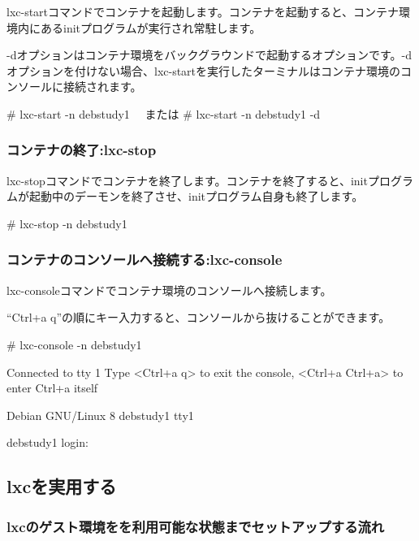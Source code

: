 \documentclass[mingoth,a4paper]{jsarticle}
\begin{document}
lxc-startコマンドでコンテナを起動します。コンテナを起動すると、コンテナ環境内にあるinitプログラムが実行され常駐します。

-dオプションはコンテナ環境をバックグラウンドで起動するオプションです。-dオプションを付けない場合、lxc-startを実行したターミナルはコンテナ環境のコンソールに接続されます。

\begin{commandline}
  # lxc-start -n debstudy1
  　または
  # lxc-start -n debstudy1 -d
\end{commandline}


\subsubsection{コンテナの終了:lxc-stop}

lxc-stopコマンドでコンテナを終了します。コンテナを終了すると、initプログラムが起動中のデーモンを終了させ、initプログラム自身も終了します。

\begin{commandline}
  # lxc-stop -n debstudy1
\end{commandline}

\subsubsection{コンテナのコンソールへ接続する:lxc-console}

lxc-consoleコマンドでコンテナ環境のコンソールへ接続します。

``Ctrl+a q''の順にキー入力すると、コンソールから抜けることができます。

\begin{commandline}
  # lxc-console -n debstudy1

  Connected to tty 1
  Type <Ctrl+a q> to exit the console, <Ctrl+a Ctrl+a> to enter Ctrl+a itself

  Debian GNU/Linux 8 debstudy1 tty1

  debstudy1 login:
\end{commandline}


\subsection{lxcを実用する}
\subsubsection{lxcのゲスト環境をを利用可能な状態までセットアップする流れ}
\end{document}
